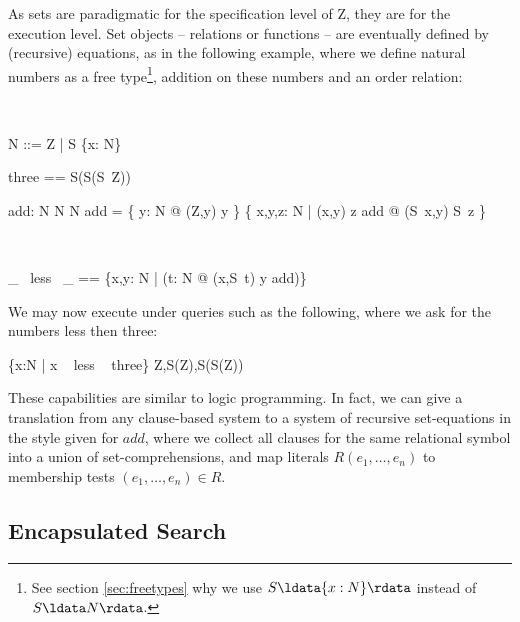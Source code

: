 \documentclass{article}
\begin{document}
As sets are paradigmatic for the specification level of Z, they are
for the execution level. Set objects -- relations or functions -- are
eventually defined by (recursive) equations, as in the following
example, where we define natural numbers as a free type\footnote{See
  section \ref{sec:freetypes} why we use $S \ldata \{x:N\} \rdata$
  instead of $S \ldata N \rdata$.}, addition on these numbers and an
order relation:

\begin{zedgroup}
\begin{zdirectives}
\end{zdirectives} \\
\begin{zed}
  N ::= Z | S \ldata \{x: N\} \rdata    
\end{zed}
\begin{axdef}
  three == S(S(S~Z))
\end{axdef}
\begin{axdef}
  add: N \cross N \fun N
\where
  add = \< 
     \{ y: N @ (Z,y) \mapsto y \} \cup %
     \{ x,y,z: N | (x,y) \mapsto z \in add @ (S~x,y) \mapsto S~z \}
   \>
\end{axdef}
\begin{zdirectives}
\end{zdirectives} \\
\begin{axdef}
  \_ ~less~ \_ == \{x,y: N | (\exists t: N @ (x,S~t) \mapsto y \in add)\}
\end{axdef}
\end{zedgroup}

We may now execute under \Zeta{} queries such as the following, 
where we ask for the numbers less then three:

\begin{zexecexpr}
  \{x:N | x ~ less ~ three\}
\yields
{Z,S(Z),S(S(Z))}
\end{zexecexpr}

These capabilities are similar to logic programming.  In
fact, we can give a translation from any clause-based system to a
system of recursive set-equations in the style given for $add$, where
we collect all clauses for the same relational symbol into a union of
set-comprehensions, and map literals $R(e_1,\ldots,e_n)$ to membership
tests $(e_1,\ldots,e_n) \in R$.

\subsection{Encapsulated Search}
\label{sec:esearch}
\end{document}

